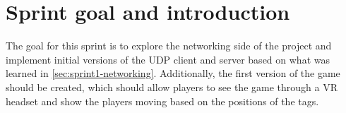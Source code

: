 \section{Sprint goal and introduction}\label{sec:sprint2-goals}
The goal for this sprint is to explore the networking side of the project and implement initial versions of the UDP client and server based on what was learned in \autoref{sec:sprint1-networking}.
Additionally, the first version of the game should be created, which should allow players to see the game through a VR headset and show the players moving based on the positions of the tags.

